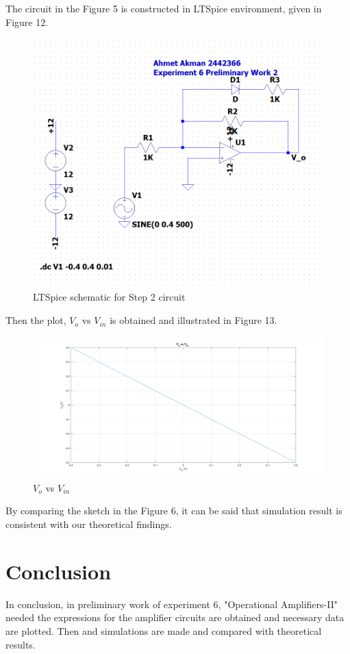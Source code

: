 \documentclass[letterpaper,12pt]{article}
\begin{document}
The circuit in the Figure 5 is constructed in LTSpice environment, given in Figure 12.
\begin{figure}[H]
	\centering
   \includegraphics[width=1\textwidth]{Pre2.png}
   \caption{LTSpice schematic for Step 2 circuit}
\end{figure} 


Then the plot, \(V_o\) vs \(V_{in}\) is obtained and illustrated in Figure 13.
\begin{figure}[H]
	\centering
   \includegraphics[width=1\textwidth]{Pre_2.png}
   \caption{\(V_o\) vs \(V_{in}\)}
\end{figure} 


By comparing the sketch in the Figure 6, it can be said that simulation result is consistent with our theoretical findings.

\section{Conclusion}
In conclusion, in preliminary work of experiment 6, "Operational Amplifiers-II"  needed the expressions for the amplifier circuits are obtained and necessary data are plotted. Then and simulations are made and compared with theoretical results.
\end{document}
